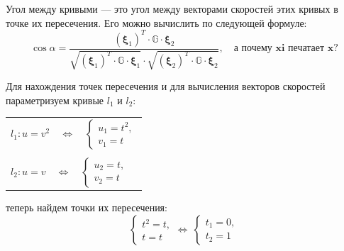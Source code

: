 \documentclass[12pt,a4paper]{article}
\newcommand{\boldVec}[1]{\mathbf #1}
\begin{document}
    Угол между кривыми --- это угол между векторами скоростей этих кривых в точке их пересечения. Его можно вычислить по следующей формуле:
    \[
        \cos \alpha = \frac {
            (\boldVec \xi_1)^T \cdot \mathbb{G} \cdot \boldVec \xi_2
        } 
        {
            \sqrt{(\boldVec \xi_1)^T \cdot \mathbb{G} \cdot \boldVec \xi_1}
             \cdot 
             \sqrt{(\boldVec \xi_2)^T \cdot \mathbb{G} \cdot \boldVec \xi_2}
        },\quad \textbf{а почему xi печатает x?}
    \]
    
    \pagebreak

    Для нахождения точек пересечения и для вычисления векторов скоростей параметризуем кривые $ l_1 $ и $ l_2 \colon$
    \begin{table}[h]
        \centering
        \begin{tabular}{l}
            $
                l_1 \colon u = v^2
                \! \! \quad \Leftrightarrow \quad
                \begin{cases}
                    u_1 = t^2,
                    \\
                    v_1 = t
                \end{cases}
            $
            \\ \\
            $
                l_2 \colon u = v
                \quad \Leftrightarrow \quad
                \begin{cases}
                    u_2 = t,
                    \\
                    v_2 = t
                \end{cases}
            $ 
        \end{tabular}
    \end{table}
    
    \noindent теперь найдем точки их пересечения:
    \[
        \begin{cases}
            t^2 = t,
            \\
            t = t
        \end{cases}
        \Leftrightarrow \ 
        \begin{cases}
            t_1 = 0,
            \\
            t_2 = 1
        \end{cases}
    \]
    
\end{document}
